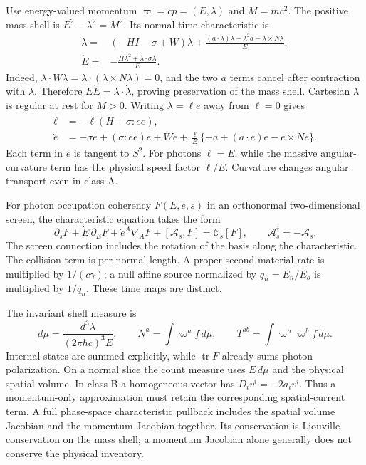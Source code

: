 Use energy-valued momentum $\varpi=cp=(E,\lambda)$ and $M=mc^2$. The positive mass shell is $E^2-\lambda^2=M^2$. Its normal-time characteristic is
\begin{align}
 \dot\lambda={}&(-HI-\sigma+W)\lambda+
 \frac{(a\cdot\lambda)\lambda-\lambda^2a-\lambda\times N\lambda}{E},
 \nonumber\\
 \dot E={}&-\frac{H\lambda^2+\lambda\cdot\sigma\lambda}{E}.
 \label{v:massive}
\end{align}
Indeed, $\lambda\cdot W\lambda=\lambda\cdot(\lambda\times N\lambda)=0$, and the two $a$ terms cancel after contraction with $\lambda$. Therefore $E\dot E=\lambda\cdot\dot\lambda$, proving preservation of the mass shell. Cartesian $\lambda$ is regular at rest for $M>0$. Writing $\lambda=\ell e$ away from $\ell=0$ gives
\begin{align}
 \dot\ell&=-\ell(H+\sigma:ee),\nonumber\\
 \dot e&=-\sigma e+(\sigma:ee)e+We
 +\frac{\ell}{E}\{-a+(a\cdot e)e-e\times Ne\}.
 \label{v:angular_drift}
\end{align}
Each term in $\dot e$ is tangent to $S^2$. For photons $\ell=E$, while the massive angular-curvature term has the physical speed factor $\ell/E$. Curvature changes angular transport even in class A.

For photon occupation coherency $F(E,e,s)$ in an orthonormal two-dimensional screen, the characteristic equation takes the form
\begin{equation}
 \partial_sF+\dot E\,\partial_EF+\dot e^A\nabla_AF+
 [\mathcal A_s,F]=\mathcal C_s[F],\qquad
 \mathcal A_s^\dagger=-\mathcal A_s .
 \label{v:matrix_transport}
\end{equation}
The screen connection includes the rotation of the basis along the characteristic. The collision term is per normal length. A proper-second material rate is multiplied by $1/(c\gamma)$; a null affine source normalized by $q_n=E_n/E_o$ is multiplied by $1/q_n$. These time maps are distinct.

The invariant shell measure is
\begin{equation}
 d\mu=\frac{d^3\lambda}{(2\pi\hbar c)^3E},\qquad
 N^a=\int\varpi^af\,d\mu,\qquad T^{ab}=\int\varpi^a\varpi^bf\,d\mu .
 \label{v:shell_measure}
\end{equation}
Internal states are summed explicitly, while $\operatorname{tr}F$ already sums photon polarization. On a normal slice the count measure uses $E\,d\mu$ and the physical spatial volume. In class B a homogeneous vector has $D_iv^i=-2a_iv^i$. Thus a momentum-only approximation must retain the corresponding spatial-current term. A full phase-space characteristic pullback includes the spatial volume Jacobian and the momentum Jacobian together. Its conservation is Liouville conservation on the mass shell; a momentum Jacobian alone generally does not conserve the physical inventory.

